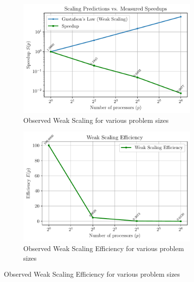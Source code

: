 \begin{figure}[h!]
    \begin{subfigure}{0.5\textwidth}
        \centering
        \includegraphics[width=0.95\linewidth]{./plots/weak_scaling.pdf}
        \caption{Observed Weak Scaling for various problem sizes}
    \end{subfigure}
    \hfill
    \begin{subfigure}{0.5\textwidth}
        \centering
        \includegraphics[width=0.95\linewidth]{./plots/weak_scaling_efficiency.pdf}
        \caption{Observed Weak Scaling Efficiency for various problem sizes}
    \end{subfigure}
    \label{fig:weak_scaling}
\end{figure}

